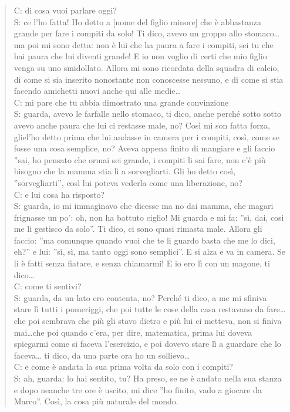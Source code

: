 \begin{verse}
C: di cosa vuoi parlare oggi?\\

S:	ce l'ho fatta! Ho detto a [nome del figlio minore] che è abbastanza grande per fare i compiti da solo! Ti dico, avevo un groppo allo stomaco\ldots{} ma poi mi sono detta: non è lui che ha paura a fare i compiti, sei tu che hai paura che lui diventi grande! E io non voglio di certi che mio figlio venga su uno smidollato. Allora mi sono ricordata della squadra di calcio, di come si sia inserito nonostante non conoscesse nessuno, e di come si stia facendo amichetti nuovi anche qui alle medie\ldots\\
C: mi pare che tu abbia dimostrato una grande convinzione\\
S: guarda, avevo le farfalle nello stomaco, ti dico, anche perché sotto sotto avevo anche paura che lui ci restasse male, no? Così mi son fatta forza, gliel'ho detto prima che lui andasse in camera per i compiti, così, come se fosse una cosa semplice, no? Aveva appena finito di mangiare e gli faccio ''sai, ho pensato che ormai sei grande, i compiti li sai fare, non c'è più bisogno che la mamma stia lì a sorvegliarti. Gli ho detto così, ''sorvegliarti'', così lui poteva vederla come una liberazione, no?\\
C: e lui cosa ha risposto?\\
S: guarda, io mi immaginavo che dicesse ma no dai mamma, che magari frignasse un po': oh, non ha battuto ciglio! Mi guarda e mi fa: ''sì, dai, cosi me li gestisco da solo''. Ti dico, ci sono quasi rimasta male. Allora gli faccio: ''ma comunque quando vuoi che te li guardo basta che me lo dici, eh?'' e lui: ''sì, sì, ma tanto oggi sono semplici''. E si alza e va in camera. Se li è fatti senza fiatare, e senza chiamarmi! E io ero lì con un magone, ti dico\ldots\\
C: come ti sentivi?\\
S: guarda, da un lato ero contenta, no? Perché ti dico, a me mi sfiniva stare lì tutti i pomeriggi, che poi tutte le cose della casa restavano da fare\ldots{}che poi sembrava che più gli stavo dietro e più lui ci metteva, non si finiva mai\ldots{}che poi quando c'era, per dire, matematica, prima lui doveva spiegarmi come si faceva l'esercizio, e poi dovevo stare lì a  guardare che lo faceva\ldots{} ti dico, da una parte ora ho un sollievo\ldots\\
C: e come è andata la sua prima volta da solo con i compiti?\\
S: ah, guarda: lo hai sentito, tu? Ha preso, se ne è andato nella sua stanza e dopo neanche tre ore è uscito, mi dice ''ho finito, vado a giocare da Marco''. Così, la cosa più naturale del mondo.\\

\end{verse}
